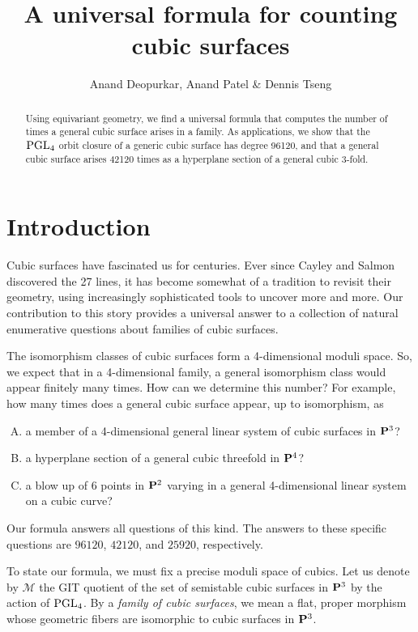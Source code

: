 \documentclass[11pt,reqno, letterpaper]{amsart}
\title{A universal formula for counting cubic surfaces}
\author{Anand Deopurkar, Anand Patel
  \& Dennis Tseng}
\numberwithin{equation}{section}
\begin{document}
\maketitle

\begin{abstract}
  Using equivariant geometry, we find a universal formula that computes the number of times a general cubic surface arises in a family.
  As applications, we show that the $\PGL_4$ orbit closure of a generic cubic surface has degree 96120, and that a general cubic surface arises 42120 times as a hyperplane section of a general cubic 3-fold.
\end{abstract}




\section{Introduction}
\label{sec:intro}

Cubic surfaces have fascinated us for centuries. Ever since Cayley and
Salmon discovered the 27 lines, it has become somewhat of a tradition
to revisit their geometry, using increasingly sophisticated tools to
uncover more and more. Our contribution to this story provides a
universal answer to a collection of natural enumerative questions
about families of cubic surfaces.

The isomorphism classes of cubic surfaces form a 4-dimensional moduli
space. So, we expect that in a 4-dimensional family, a general
isomorphism class would appear finitely many times. How can we
determine this number? For example, how many times does a general
cubic surface appear, up to isomorphism, as
\begin{enumerate}[(A)]
\item \label{orbit} a member of a 4-dimensional general linear system of cubic surfaces in $\P^3$?
\item \label{slice} a hyperplane section of a general cubic threefold in $\P^4$?
\item a blow up of 6 points in $\P^2$ varying in a general
  4-dimensional linear system on a cubic curve?
\end{enumerate}
Our formula answers all questions of this kind.  The answers to these
specific questions are $96120$, $42120$, and $25920$, respectively.

To state our formula, we must fix a precise moduli space of cubics.
Let us denote by $\mathcal M$ the GIT quotient of the set of
semistable cubic surfaces in $\P^3$ by the action of $\PGL_4$.  By a
\emph{family of cubic surfaces}, we mean a flat, proper morphism whose
geometric fibers are isomorphic to cubic surfaces in $\P^3$.
\end{document}
